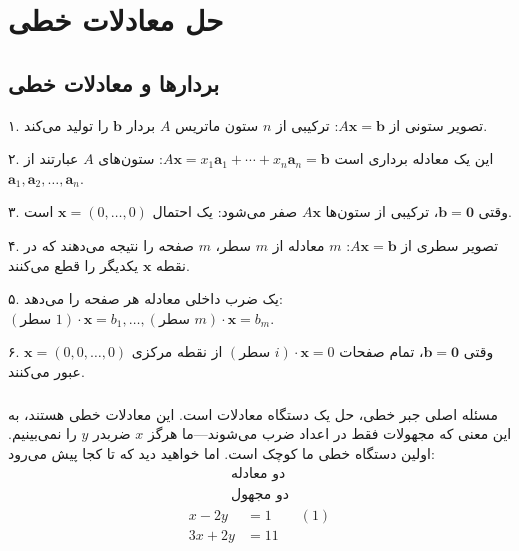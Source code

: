 \documentclass[12pt, a4paper]{book}
\begin{document}
	
	\onehalfspacing
	
	\chapter{حل معادلات خطی}
	\label{chap:solving_linear_equations}
	
	\section{بردارها و معادلات خطی}
	\label{sec:vectors_linear_equations}
	
	۱. تصویر ستونی از \( A\mathbf{x} = \mathbf{b} \): ترکیبی از \( n \) ستون ماتریس \( A \) بردار \( \mathbf{b} \) را تولید می‌کند.
	
	۲. این یک معادله برداری است \( A\mathbf{x} = x_1\mathbf{a}_1 + \cdots + x_n\mathbf{a}_n = \mathbf{b} \): ستون‌های \( A \) عبارتند از \( \mathbf{a}_1, \mathbf{a}_2, \ldots, \mathbf{a}_n \).
	
	۳. وقتی \( \mathbf{b} = \mathbf{0} \)، ترکیبی از ستون‌ها \( A\mathbf{x} \) صفر می‌شود: یک احتمال \( \mathbf{x} = (0, \ldots, 0) \) است.
	
	۴. تصویر سطری از \( A\mathbf{x} = \mathbf{b} \): \( m \) معادله از \( m \) سطر، \( m \) صفحه را نتیجه می‌دهند که در نقطه \( \mathbf{x} \) یکدیگر را قطع می‌کنند.
	
	۵. یک ضرب داخلی معادله هر صفحه را می‌دهد: \( (\text{سطر } 1) \cdot \mathbf{x} = b_1, \ldots, (\text{سطر } m) \cdot \mathbf{x} = b_m \).
	
	۶. وقتی \( \mathbf{b} = \mathbf{0} \)، تمام صفحات \( (\text{سطر } i) \cdot \mathbf{x} = 0 \) از نقطه مرکزی \( \mathbf{x} = (0, 0, \ldots, 0) \) عبور می‌کنند.
	
	\paragraph{}
	مسئله اصلی جبر خطی، حل یک دستگاه معادلات است. این معادلات خطی هستند، به این معنی که مجهولات فقط در اعداد ضرب می‌شوند—ما هرگز \( x \) ضربدر \( y \) را نمی‌بینیم. اولین دستگاه خطی ما کوچک است. اما خواهید دید که تا کجا پیش می‌رود:
	\begin{align*}
		\text{دو معادله} \\
		\text{دو مجهول}
	\end{align*}
	\begin{align*}
		x - 2y &= 1 \quad\quad (1) \\
		3x + 2y &= 11
	\end{align*}
	
\end{document}
